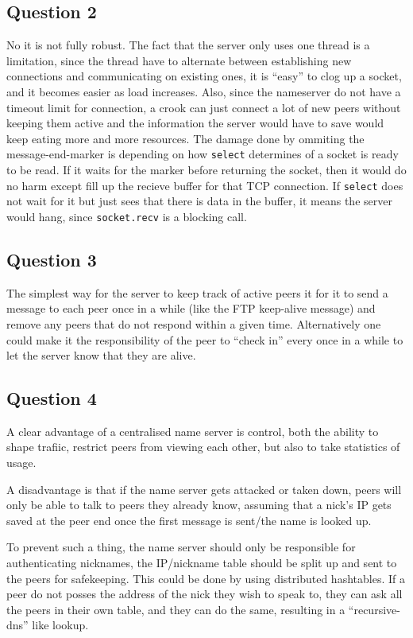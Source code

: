 \documentclass[10pt]{article}
\begin{document}
\subsection{Question 2}
No it is not fully robust. The fact that the server only uses one
thread is a limitation, since the thread have to alternate between
establishing new connections and communicating on existing ones, it is
``easy'' to clog up a socket, and it becomes easier as load increases.
Also, since the nameserver do not have a timeout limit for connection,
a crook can just connect a lot of new peers without keeping them
active and the information the server would have to save would keep
eating more and more resources. The damage done by ommiting the
message-end-marker is depending on how \texttt{select} determines of a
socket is ready to be read. If it waits for the marker before
returning the socket, then it would do no harm except fill up the
recieve buffer for that TCP connection. If \texttt{select} does not
wait for it but just sees that there is data in the buffer, it means
the server would hang, since \texttt{socket.recv} is a blocking call.

\subsection{Question 3}
The simplest way for the server to keep track of active peers it for
it to send a message to each peer once in a while (like the FTP
keep-alive message) and remove any peers that do not respond within a
given time. Alternatively one could make it the responsibility of the
peer to ``check in'' every once in a while to let the server know that
they are alive.

\subsection{Question 4}
A clear advantage of a centralised name server is control, both the
ability to shape trafiic, restrict peers from viewing each other, but
also to take statistics of usage.

A disadvantage is that if the name server gets attacked or taken down,
peers will only be able to talk to peers they already know, assuming
that a nick's IP gets saved at the peer end once the first message is
sent/the name is looked up.

To prevent such a thing, the name server should only be responsible
for authenticating nicknames, the IP/nickname table should be split up
and sent to the peers for safekeeping. This could be done by using
distributed hashtables. If a peer do not posses the address of the
nick they wish to speak to, they can ask all the peers in their own
table, and they can do the same, resulting in a ``recursive-dns'' like
lookup.
\end{document}

